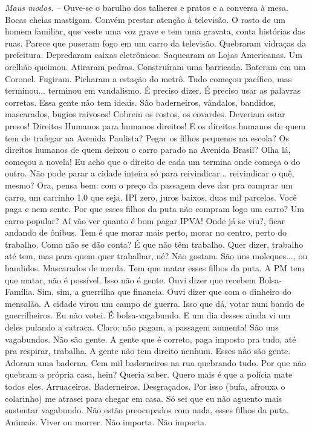 \emph{Maus modos. -- }Ouve-se o barulho dos talheres e pratos e a
conversa à mesa. Bocas cheias mastigam. Convém prestar atenção à
televisão. O rosto de um homem familiar, que veste uma voz grave e tem
uma gravata, conta histórias das ruas. Parece que puseram fogo em um
carro da televisão. Quebraram vidraças da prefeitura. Depredaram caixas
eletrônicos. Saquearam as Lojas Americanas. Um orelhão queimou. Atiraram
pedras. Construíram uma barricada. Bateram em um Coronel. Fugiram.
Picharam a estação do metrô. Tudo começou pacífico, mas terminou...
terminou em vandalismo. É preciso dizer. É preciso usar as palavras
corretas. Essa gente não tem ideais. São baderneiros, vândalos,
bandidos, mascarados, bugios raivosos! Cobrem os rostos, os covardes.
Deveriam estar presos! Direitos Humanos para humanos direitos! E os
direitos humanos de quem tem de trafegar na Avenida Paulista? Pegar os
filhos pequenos na escola? Os direitos humanos de quem deixou o carro
parado na Avenida Brasil? Olha lá, começou a novela! Eu acho que o
direito de cada um termina onde começa o do outro. Não pode parar a
cidade inteira só para reivindicar... reivindicar o quê, mesmo? Ora,
pensa bem: com o preço da passagem deve dar pra comprar um carro, um
carrinho 1.0 que seja. IPI zero, juros baixos, duas mil parcelas. Você
paga e nem sente. Por que esses filhos da puta não compram logo um
carro? Um carro popular? Aí vão ver quanto é bom pagar IPVA! Onde já se
viu?, ficar andando de ônibus. Tem é que morar mais perto, morar no
centro, perto do trabalho. Como não se dão conta? É que não têm
trabalho. Quer dizer, trabalho até tem, mas para quem quer trabalhar,
né? Não gostam. São uns moleques..., ou bandidos. Mascarados de merda.
Tem que matar esses filhos da puta. A PM tem que matar, não é possível.
Isso não é gente. Ouvi dizer que recebem Bolsa-Família. Sim, sim, a
guerrilha que financia. Ouvi dizer que com o dinheiro do mensalão. A
cidade virou um campo de guerra. Isso que dá, votar num bando de
guerrilheiros. Eu não votei. É bolsa-vagabundo. E um dia desses ainda vi
um deles pulando a catraca. Claro: não pagam, a passagem aumenta! São
uns vagabundos. Não são gente. A gente que é correto, paga imposto pra
tudo, até pra respirar, trabalha. A gente não tem direito nenhum. Esses
não são gente. Adoram uma baderna. Cem mil baderneiros na rua quebrando
tudo. Por que não quebram a própria casa, hein? Queria saber. Quero mais
é que a polícia mate todos eles. Arruaceiros. Baderneiros. Desgraçados.
Por isso (bufa, afrouxa o colarinho) me atrasei para chegar em casa. Só
sei que eu não aguento mais sustentar vagabundo. Não estão preocupados
com nada, esses filhos da puta. Animais. Viver ou morrer. Não importa.
Não importa.

